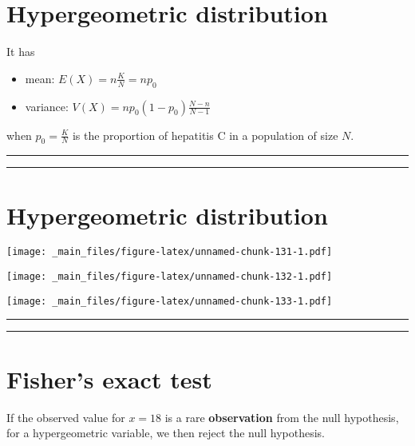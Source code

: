 \documentclass[
]{book}
\begin{document}
\hypertarget{hypergeometric-distribution-4}{%
\section{Hypergeometric distribution}\label{hypergeometric-distribution-4}}

It has

\begin{itemize}
\item
  mean: \(E (X) = n \frac{K}{N} = np_0\)
\item
  variance: \(V(X) = np_0(1-p_0)\frac{N-n}{N-1}\)
\end{itemize}

when \(p_0=\frac{K}{N}\) is the proportion of hepatitis C in a population of size \(N\).

\begin{center}\rule{0.5\linewidth}{0.5pt}\end{center}

\begin{center}\rule{0.5\linewidth}{0.5pt}\end{center}

\hypertarget{hypergeometric-distribution-5}{%
\section{Hypergeometric distribution}\label{hypergeometric-distribution-5}}

\texttt{[image: \_main\_files/figure-latex/unnamed-chunk-131-1.pdf]}

\texttt{[image: \_main\_files/figure-latex/unnamed-chunk-132-1.pdf]}

\texttt{[image: \_main\_files/figure-latex/unnamed-chunk-133-1.pdf]}

\begin{center}\rule{0.5\linewidth}{0.5pt}\end{center}

\begin{center}\rule{0.5\linewidth}{0.5pt}\end{center}

\hypertarget{fishers-exact-test-2}{%
\section{Fisher's exact test}\label{fishers-exact-test-2}}

If the observed value for \(x=18\) is a rare \textbf{observation} from the null hypothesis, for a hypergeometric variable, we then reject the null hypothesis.
\end{document}
